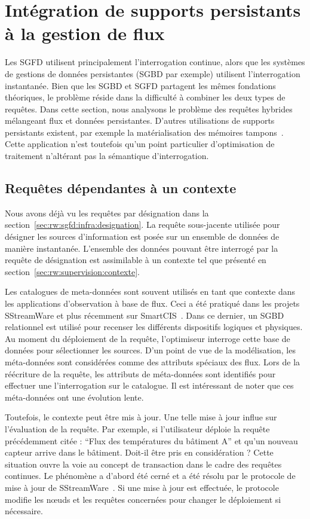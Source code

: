 \section{Intégration de supports persistants à la gestion de flux}\label{sec:rw:sgfd:persistance}
Les SGFD utilisent principalement l'interrogation continue, alors que les systèmes de gestions de données persistantes (SGBD par exemple) utilisent l'interrogation instantanée. Bien que les SGBD et SGFD partagent les mêmes fondations théoriques, le problème réside dans la difficulté à combiner les deux types de requêtes. Dans cette section, nous analysons le problème des requêtes hybrides mélangeant flux et données persistantes. D'autres utilisations de supports persistants existent, par exemple la matérialisation des mémoires tampons~\cite{Abadi:aurora}. Cette application n'est toutefois qu'un point particulier d'optimisation de traitement n'altérant pas la sémantique d'interrogation.

\subsection{Requêtes dépendantes à un contexte}
Nous avons déjà vu les requêtes par désignation dans la section~\ref{sec:rw:sgfd:infra:designation}. La requête sous-jacente utilisée pour désigner les sources d'information est posée sur un ensemble de données de manière instantanée. L'ensemble des données pouvant être interrogé par la requête de désignation est assimilable à un contexte tel que présenté en section~\ref{sec:rw:supervision:contexte}.

Les catalogues de meta-données sont souvent utilisés en tant que contexte dans les applications d'observation à base de flux. Ceci a été pratiqué dans les projets SStreamWare et plus récemment sur SmartCIS~\cite{Liu:smartcis}. Dans ce dernier, un SGBD relationnel est utilisé pour recenser les différents dispositifs logiques et physiques. Au moment du déploiement de la requête, l'optimiseur interroge cette base de données pour sélectionner les sources. D'un point de vue de la modélisation, les méta-données sont considérées comme des attributs spéciaux des flux. Lors de la réécriture de la requête, les attributs de méta-données sont identifiés pour effectuer une l'interrogation sur le catalogue. Il est intéressant de noter que ces méta-données ont une évolution lente.

Toutefois, le contexte peut être mis à jour. Une telle mise à jour influe sur l'évaluation de la requête. Par exemple, si l'utilisateur déploie la requête précédemment citée : \enquote{Flux des températures du bâtiment A} et qu'un nouveau capteur arrive dans le bâtiment. Doit-il être pris en considération ? Cette situation ouvre la voie au concept de transaction dans le cadre des requêtes continues. Le phénomène a d'abord été cerné et a été résolu par le protocole de mise à jour de SStreamWare~\cite{Gurgen:transaction}. Si une mise à jour est effectuée, le protocole modifie les nœuds et les requêtes concernées pour changer le déploiement si nécessaire.

